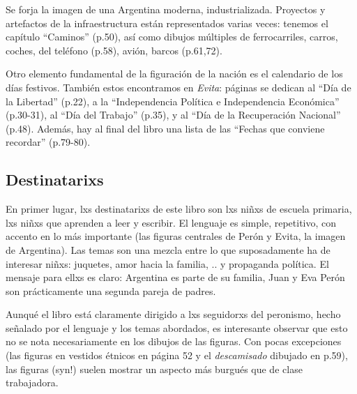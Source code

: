 Se forja la imagen de una Argentina moderna, industrializada.
Proyectos y artefactos de la infraestructura están representados varias veces:
tenemos el capítulo ``Caminos'' (p.50), así como dibujos múltiples de ferrocarriles, carros, coches, del teléfono (p.58), avión, barcos (p.61,72).

Otro elemento fundamental de la figuración de la nación es el calendario de los días festivos.
También estos encontramos en \textit{Evita}:
páginas se dedican al
``Día de la Libertad'' (p.22),
a la ``Independencia Política e Independencia Económica'' (p.30-31),
al ``Día del Trabajo'' (p.35),
y al ``Día de la Recuperación Nacional'' (p.48).
Además, hay al final del libro una lista de las ``Fechas que conviene recordar'' (p.79-80).


\subsection{Destinatarixs}

En primer lugar, lxs destinatarixs de este libro son lxs niñxs de escuela primaria, lxs niñxs que aprenden a leer y escribir.
El lenguaje es simple, repetitivo, con accento en lo más importante (las figuras centrales de Perón y Evita, la imagen de Argentina).
Las temas son una mezcla entre lo que suposadamente ha de interesar niñxs: juquetes, amor hacia la familia, .. y propaganda política.
El mensaje para ellxs es claro: Argentina es parte de su familia, Juan y Eva Perón son prácticamente una segunda pareja de padres.

Aunqué el libro está claramente dirigido a lxs seguidorxs del peronismo,
hecho señalado por el lenguaje y los temas abordados,
es interesante observar que esto no se nota necesariamente en los dibujos de las figuras.
Con pocas excepciones (las figuras en vestidos étnicos en página 52 y el \textit{descamisado} dibujado en p.59),
las figuras (syn!) suelen mostrar un aspecto más burgués que de clase trabajadora.


\begin{comment}

* "Policlínico Evita" (p.43), "Fundación Eva Perón"(p.43), "clubes infantiles Evita" (donde se practica futbol^^)(p.55)
* se rescatan los éxitos (el voto femenino, el pago de las deudas, p.72...)

* p.10: oraciones, rezar, catolicismo; pero también aquí "nunca olvido a Eva Perón, nuestra Madre Espiritual"
  * gottesgleichheit (hat anscheinend die kirche etwas verstoert^^ -- Chamosa o FF?)
  * kann alle wuensche verwirklichen
\end{comment}
